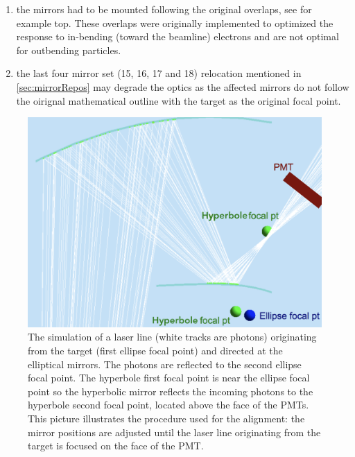 \begin{enumerate}
	\item the mirrors had to be mounted following the original overlaps, see for example  top.
			These overlaps were originally implemented to optimized the response to in-bending (toward the beamline)
			electrons and are not optimal for outbending particles.
	\item the last four mirror set (15, 16, 17 and 18) relocation mentioned in \ref{sec:mirrorRepos} may degrade the optics as
	      the affected mirrors do not follow the oirignal mathematical outline with the target as the original focal point.
\end{enumerate}



\begin{figure}
\centering
	\includegraphics[width=0.99\columnwidth,  height=0.75\columnwidth]{img/mirrorAlignmentSimulationZoomed.png}
	\caption{The simulation of a laser line (white tracks are photons) originating from the target (first ellipse focal point) and directed at the elliptical mirrors.
             The photons are reflected to the second ellipse focal point. The hyperbole first focal point is near the ellipse focal point so the hyperbolic mirror
			 reflects the incoming photons to the hyperbole second focal point, located above the face of the PMTs.
			 This picture illustrates the procedure used for the alignment: the mirror positions are adjusted until the laser line originating from
			 the target is focused on the face of the PMT.}
	\label{fig:alignmentSimulation}
\end{figure}

